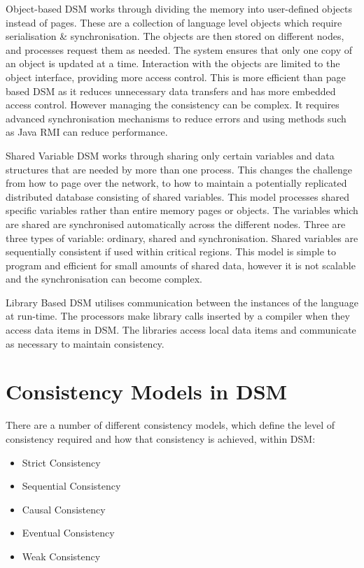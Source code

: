 Object-based DSM works through dividing the memory into user-defined objects instead of pages. These are a collection of language level objects which require serialisation \& synchronisation. The objects are then stored on different nodes, and processes request them as needed. The system ensures that only one copy of an object is updated at a time. Interaction with the objects are limited to the object interface, providing more access control. This is more efficient than page based DSM as it reduces unnecessary data transfers and has more embedded access control. However managing the consistency can be complex. It requires advanced synchronisation mechanisms to reduce errors and using methods such as Java RMI can reduce performance. 

Shared Variable DSM works through sharing only certain variables and data structures that are needed by more than one process. This changes the challenge from how to page over the network, to how to maintain a potentially replicated distributed database consisting of shared variables. This model processes shared specific variables rather than entire memory pages or objects. The variables which are shared are synchronised automatically across the different nodes. Three are three types of variable: ordinary, shared and synchronisation. Shared variables are sequentially consistent if used within critical regions. This model is simple to program and efficient for small amounts of shared data, however it is not scalable and the synchronisation can become complex.

Library Based DSM utilises communication between the instances of the language at run-time. The processors make library calls inserted by a compiler when they access data items in DSM. The libraries access local data items and communicate as necessary to maintain consistency. 

\section{Consistency Models in DSM}
There are a number of different consistency models, which define the level of consistency required and how that consistency is achieved, within DSM:
\begin{itemize}
    \item Strict Consistency
    \item Sequential Consistency
    \item Causal Consistency
    \item Eventual Consistency
    \item Weak Consistency
\end{itemize}

